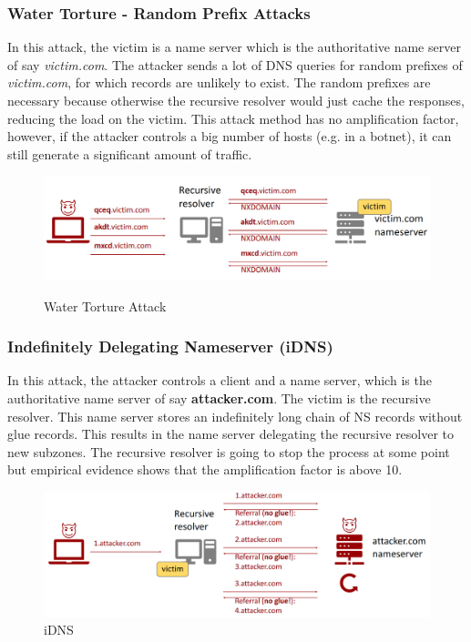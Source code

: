 \subsubsection{Water Torture - Random Prefix Attacks}
In this attack, the victim is a name server which is the authoritative name server of say \textit{victim.com}. The attacker sends a lot of DNS queries for random prefixes of \textit{victim.com}, for which records are unlikely to exist. The random prefixes are necessary because otherwise the recursive resolver would just cache the responses, reducing the load on the victim. This attack method has no amplification factor, however, if the attacker controls a big number of hosts (e.g. in a botnet), it can still generate a significant amount of traffic.
\begin{figure}[H]
\centering
\includegraphics[width=.7\textwidth]{images/water_torture.PNG}
\label{water_torture}
\caption{Water Torture Attack}
\end{figure}

\subsubsection{Indefinitely Delegating Nameserver (iDNS)}
In this attack, the attacker controls a client and a name server, which is the authoritative name server of say \textbf{attacker.com}. The victim is the recursive resolver. This name server stores an indefinitely long chain of NS records without glue records. This results in the name server delegating the recursive resolver to new subzones. The recursive resolver is going to stop the process at some point but empirical evidence shows that the amplification factor is above 10.
\begin{figure}[H]
\centering
\includegraphics[width=.7\textwidth]{images/idns.PNG}
\caption{iDNS}
\label{idns}
\end{figure}

